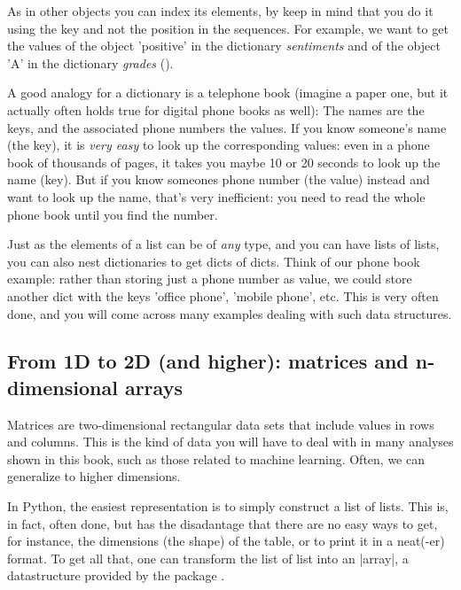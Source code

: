 
As in other objects you can index its elements, by keep in mind that
you do it using the key and not the position in the sequences. For
example, we want to get the values of the object 'positive' in the
dictionary \emph{sentiments} and of the object 'A' in the dictionary
\emph{grades} ().

A good analogy for a dictionary is a telephone book (imagine a paper
one, but it actually often holds true for digital phone books as
well): The names are the keys, and the associated phone numbers the
values. If you know someone's name (the key), it is \emph{very easy}
to look up the corresponding values: even in a phone book of thousands
of pages, it takes you maybe 10 or 20 seconds to look up the name
(key). But if you know someones phone number (the value) instead and
want to look up the name, that's very inefficient: you need to read
the whole phone book until you find the number.

Just as the elements of a list can be of \emph{any} type, and you can
have lists of lists, you can also nest dictionaries to get dicts of
dicts. Think of our phone book example: rather than storing just a
phone number as value, we could store another dict with the keys
'office phone', 'mobile phone', etc. This is very often done, and you
will come across many examples dealing with such data structures.




\subsection{From 1D to 2D (and higher): matrices and n-dimensional arrays}

Matrices are two-dimensional rectangular data sets that include values
in rows and columns. This is the kind of data you will have to deal
with in many analyses shown in this book, such as those related to
machine learning. Often, we can generalize to higher dimensions.


In Python, the easiest representation is to simply construct a list of
lists. This is, in fact, often done, but has the disadantage that
there are no easy ways to get, for instance, the dimensions (the
shape) of the table, or to print it in a neat(-er) format. To get all
that, one can transform the list of list into an |array|, a
datastructure provided by the package .

